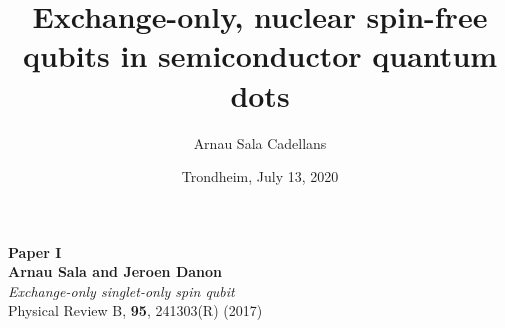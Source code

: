 \documentclass[11pt,b5paper]{memoir} %
\author{Arnau Sala Cadellans}
\title{Exchange-only, nuclear spin-free qubits in semiconductor quantum dots}
\date{Trondheim, July 13, 2020}
\begin{document}


\clearpage\maketitle
\thispagestyle{empty}







\cleardoublepage

\begin{KeepFromToc}
  \tableofcontents
\end{KeepFromToc}
\cleardoublepage

























\cleardoublepage
\thispagestyle{empty}
\begin{vplace}[0.7]
\begin{center}
\textbf{\huge Paper I}\\
\vspace{3ex}
\textbf{Arnau Sala and Jeroen Danon}\\
\vspace{2ex}
\textit{Exchange-only singlet-only spin qubit}\\
\vspace{2ex}
Physical Review B, \textbf{95}, 241303(R) (2017)
\end{center}
\end{vplace}
\cleardoublepage

\end{document}
